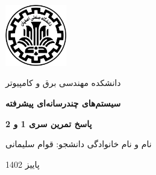 
\begin{titlepage}
	
	\begin{center}
		
        	\includegraphics[width=0.2\textwidth]{iut.png}

		\large
		دانشکده مهندسی برق و کامپیوتر
		
		\vfill
		\Large
		
		\textbf{سیستم‌های چندرسانه‌ای پیشرفته}
		\\
	
		\vfill
		
		\large
\textbf{پاسخ تمرین سری 1 و 2}
		\vfill

		
		نام و نام خانوادگی دانشجو: قوام سلیمانی


\vfill
پاییز 1402
	\end{center}
\end{titlepage}
